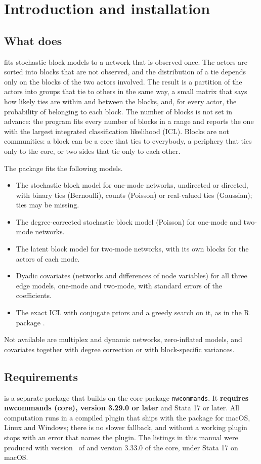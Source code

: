 \chapter{Introduction and installation}

\section{What \nwsbm{} does}
\nwsbm{} fits stochastic block models to a network that is observed once. The actors are sorted into blocks that are not observed, and the distribution of a tie depends only on the blocks of the two actors involved. The result is a partition of the actors into groups that tie to others in the same way, a small matrix that says how likely ties are within and between the blocks, and, for every actor, the probability of belonging to each block. The number of blocks is not set in advance: the program fits every number of blocks in a range and reports the one with the largest integrated classification likelihood (ICL). Blocks are not communities: a block can be a core that ties to everybody, a periphery that ties only to the core, or two sides that tie only to each other.

The package fits the following models.
\begin{itemize}[nosep]
\item The stochastic block model for one-mode networks, undirected or directed, with binary ties (Bernoulli), counts (Poisson) or real-valued ties (Gaussian); ties may be missing.
\item The degree-corrected stochastic block model (Poisson) for one-mode and two-mode networks.
\item The latent block model for two-mode networks, with its own blocks for the actors of each mode.
\item Dyadic covariates (networks and differences of node variables) for all three edge models, one-mode and two-mode, with standard errors of the coefficients.
\item The exact ICL with conjugate priors and a greedy search on it, as in the R package \greed{}.
\end{itemize}
Not available are multiplex and dynamic networks, zero-inflated models, and covariates together with degree correction or with block-specific variances.

\section{Requirements}
\nwsbm{} is a separate package that builds on the core package \texttt{nwcommands}. It \textbf{requires nwcommands (core), version 3.29.0 or later} and Stata 17 or later. All computation runs in a compiled plugin that ships with the package for macOS, Linux and Windows; there is no slower fallback, and without a working plugin \nwsbm{} stops with an error that names the plugin. The listings in this manual were produced with version~\pkgversion{} of \nwsbm{} and version 3.33.0 of the core, under Stata 17 on macOS.

